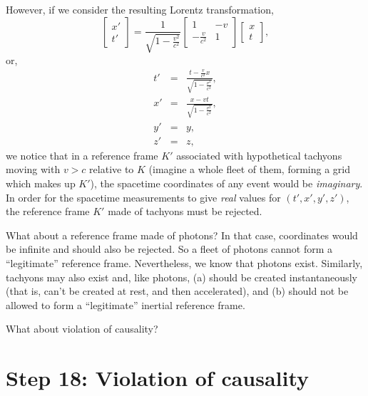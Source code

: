 \documentclass[twocolumn,preprintnumbers,amsmath,amssymb,final]{revtex4}
\def\BEq{\begin{equation}}
\def\EEq{\end{equation}}
\def\BEqA{\begin{eqnarray}}
\def\EEqA{\end{eqnarray}}
\begin{document}
\noindent However, if we consider the resulting Lorentz transformation,
\BEq
\begin{bmatrix}
x' \\ t'
\end{bmatrix}
=
\frac{1}{\sqrt{1-\frac{v^2}{c^2}}}
\begin{bmatrix}
1 & -v  \\
-\frac{v}{c^2} & 1
\end{bmatrix}
\begin{bmatrix}
x \\ t
\end{bmatrix},
\EEq
or,
\BEqA
\label{eq:77}
t'&=&\frac{t-\frac{v}{c^2}x}{\sqrt{1-\frac{v^2}{c^2}}},
\\
\label{eq:78}
x'&=&\frac{x-vt}{\sqrt{1-\frac{v^2}{c^2}}},
\\
y'&=&y,
\\
z'&=&z,
\EEqA
we notice that in a reference frame $K'$ associated with hypothetical tachyons moving with $v>c$ 
relative to $K$ (imagine a whole fleet of them, forming a grid which makes up $K'$), the spacetime 
coordinates of any event would be {\it imaginary}.
In order for the spacetime measurements to give {\it real} values for
$(t',x',y',z')$, the reference frame $K'$ made of tachyons must be rejected. 

What about a reference frame made of photons?
In that case, coordinates would be infinite and should also be rejected. So a fleet of photons cannot form 
a ``legitimate'' reference frame. 
Nevertheless, we know that photons exist.
Similarly, tachyons may also exist and, like photons, 
(a) should be created instantaneously (that is, can't be 
created at rest, and then accelerated), and 
(b) should not be allowed to form a ``legitimate'' inertial reference 
frame. 

What about violation of causality?


\section*{Step 18: Violation of causality}
\end{document}
